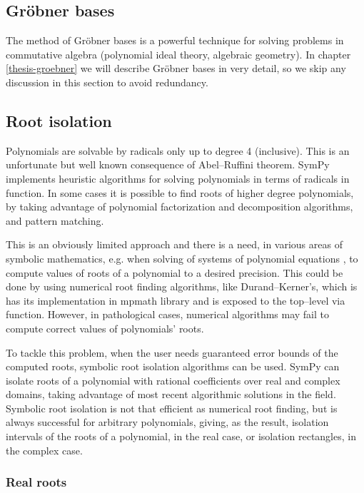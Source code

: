 \subsection{Gröbner bases}

The method of Gröbner bases is a powerful technique for solving problems in commutative
algebra (polynomial ideal theory, algebraic geometry). In chapter \ref{thesis-groebner}
we will describe Gröbner bases in very detail, so we skip any discussion in this section
to avoid redundancy.


\subsection{Root isolation}

Polynomials are solvable by radicals only up to degree 4 (inclusive). This is an unfortunate
but well known consequence of Abel--Ruffini theorem. SymPy implements heuristic algorithms
for solving polynomials in terms of radicals in  function. In some cases it is
possible to find roots of higher degree polynomials, by taking advantage of polynomial
factorization and decomposition algorithms, and pattern matching.

This is an obviously limited approach and there is a need, in various areas of symbolic
mathematics, e.g. when solving of systems of polynomial equations \cite{Strzebonski1997computing},
to compute values of roots of a polynomial to a desired precision. This could be done by using
numerical root finding algorithms, like Durand--Kerner's, which is has its implementation
in mpmath library and is exposed to the top--level via  function. However, in
pathological cases, numerical algorithms may fail to compute correct values of polynomials'
roots.

To tackle this problem, when the user needs guaranteed error bounds of the computed roots,
symbolic root isolation algorithms can be used. SymPy can isolate roots of a polynomial with
rational coefficients over real and complex domains, taking advantage of most recent algorithmic
solutions in the field. Symbolic root isolation is not that efficient as numerical root finding,
but is always successful for arbitrary polynomials, giving, as the result, isolation intervals
of the roots of a polynomial, in the real case, or isolation rectangles, in the complex case.


\subsubsection{Real roots}

